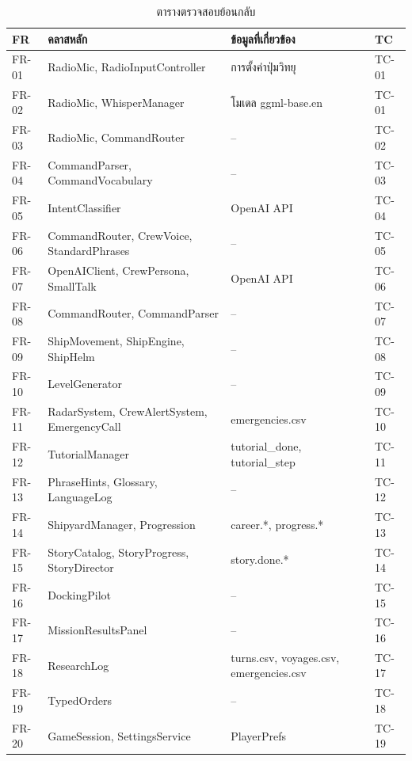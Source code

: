 \begin{table}[!htbp]
\centering
\caption{ตารางตรวจสอบย้อนกลับ}
\label{tab:traceability}
\begin{tabular}{|L{1.20cm}|L{5.40cm}|L{4.60cm}|L{1.40cm}|}
\hline
\textbf{FR} & \textbf{คลาสหลัก} & \textbf{ข้อมูลที่เกี่ยวข้อง} & \textbf{TC} \\
\hline
FR-01 & RadioMic, RadioInputController & การตั้งค่าปุ่มวิทยุ & TC-01 \\ \hline
FR-02 & RadioMic, WhisperManager & โมเดล ggml-base.en & TC-01 \\ \hline
FR-03 & RadioMic, CommandRouter & -- & TC-02 \\ \hline
FR-04 & CommandParser, CommandVocabulary & -- & TC-03 \\ \hline
FR-05 & IntentClassifier & OpenAI API & TC-04 \\ \hline
FR-06 & CommandRouter, CrewVoice, StandardPhrases & -- & TC-05 \\ \hline
FR-07 & OpenAIClient, CrewPersona, SmallTalk & OpenAI API & TC-06 \\ \hline
FR-08 & CommandRouter, CommandParser & -- & TC-07 \\ \hline
FR-09 & ShipMovement, ShipEngine, ShipHelm & -- & TC-08 \\ \hline
FR-10 & LevelGenerator & -- & TC-09 \\ \hline
FR-11 & RadarSystem, CrewAlertSystem, EmergencyCall & emergencies.csv & TC-10 \\ \hline
FR-12 & TutorialManager & tutorial\_done, tutorial\_step & TC-11 \\ \hline
FR-13 & PhraseHints, Glossary, LanguageLog & -- & TC-12 \\ \hline
FR-14 & ShipyardManager, Progression & career.*, progress.* & TC-13 \\ \hline
FR-15 & StoryCatalog, StoryProgress, StoryDirector & story.done.* & TC-14 \\ \hline
FR-16 & DockingPilot & -- & TC-15 \\ \hline
FR-17 & MissionResultsPanel & -- & TC-16 \\ \hline
FR-18 & ResearchLog & turns.csv, voyages.csv, emergencies.csv & TC-17 \\ \hline
FR-19 & TypedOrders & -- & TC-18 \\ \hline
FR-20 & GameSession, SettingsService & PlayerPrefs & TC-19 \\
\hline
\end{tabular}
\end{table}

